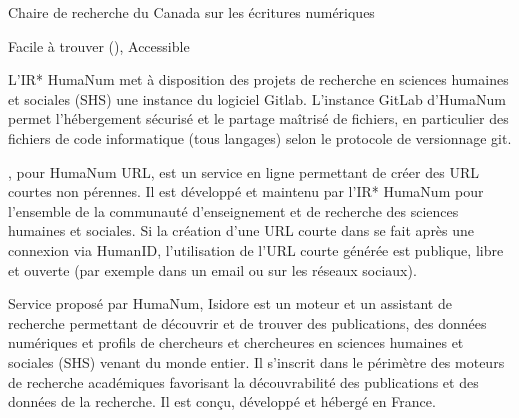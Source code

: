 \documentclass[letterpaper,10pt,english]{jupyterBook}
\begin{document}
\label{\detokenize{glossaire:glossaire}}\label{\detokenize{glossaire::doc}}\begin{description}
\sphinxAtStartPar
Chaire de recherche du Canada sur les écritures numériques

\sphinxAtStartPar
Facile à trouver (), Accessible

\sphinxAtStartPar
L’IR* Huma\sphinxhyphen{}Num met à disposition des projets de recherche en sciences humaines et sociales (SHS) une instance du logiciel Gitlab. L’instance GitLab d’Huma\sphinxhyphen{}Num permet l’hébergement sécurisé et le partage maîtrisé de fichiers, en particulier des fichiers de code informatique (tous langages) selon le protocole de versionnage git.

\sphinxAtStartPar
{}, pour Huma\sphinxhyphen{}Num URL, est un service en ligne permettant de créer des URL courtes non pérennes. Il est développé et maintenu par l’IR* Huma\sphinxhyphen{}Num pour l’ensemble de la communauté d’enseignement et de recherche des sciences humaines et sociales. Si la création d’une URL courte dans  se fait après une connexion via HumanID, l’utilisation de l’URL courte générée est publique, libre et ouverte (par exemple dans un email ou sur les réseaux sociaux).

\sphinxAtStartPar
Service proposé par Huma\sphinxhyphen{}Num, Isidore est un moteur et un assistant de recherche permettant de découvrir et de trouver des publications, des données numériques et profils de chercheurs et chercheures en sciences humaines et sociales (SHS) venant du monde entier. Il s’inscrit dans le périmètre des moteurs de recherche académiques favorisant la découvrabilité des publications et des données de la recherche. Il est conçu, développé et hébergé en France.


\end{description}
\end{document}
